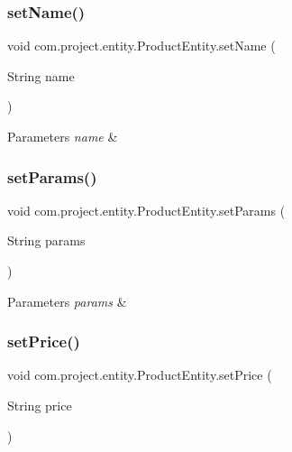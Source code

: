 \subsubsection{set\+Name()}
{\footnotesize\ttfamily void com.\+project.\+entity.\+Product\+Entity.\+set\+Name (\begin{DoxyParamCaption}\item[{String}]{name }\end{DoxyParamCaption})}


\begin{DoxyParams}{Parameters}
{\em name} & \\
\hline
\end{DoxyParams}
\mbox{\label{classcom_1_1project_1_1entity_1_1_product_entity_a0c4bd4b2b74e864259780f401540da11}} 
\subsubsection{set\+Params()}
{\footnotesize\ttfamily void com.\+project.\+entity.\+Product\+Entity.\+set\+Params (\begin{DoxyParamCaption}\item[{String}]{params }\end{DoxyParamCaption})}


\begin{DoxyParams}{Parameters}
{\em params} & \\
\hline
\end{DoxyParams}
\mbox{\label{classcom_1_1project_1_1entity_1_1_product_entity_a5160f5c66011013b9f5a9eee2a953da7}} 
\subsubsection{set\+Price()}
{\footnotesize\ttfamily void com.\+project.\+entity.\+Product\+Entity.\+set\+Price (\begin{DoxyParamCaption}\item[{String}]{price }\end{DoxyParamCaption})}


